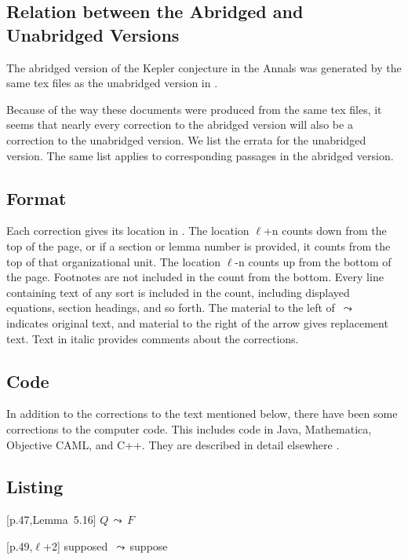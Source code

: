 \documentclass[11pt]{amsart}
\def\lto{\ensuremath{\,\leadsto\,}}
\def\line{$\ell$}
\begin{document}
\subsection{Relation between the Abridged and Unabridged Versions}

The abridged version of the Kepler conjecture
in the Annals \cite{Hales:2005:Annals}
was generated by the same tex
files as the unabridged version in \cite{Hales:2006:DCG}.

Because of the way these documents were produced
from the same tex files,
it seems that nearly every correction to
the abridged version will also be a correction to the unabridged version.
We list the errata for the
unabridged version. The same list applies to corresponding 
passages in the abridged version.  


\subsection{Format}

Each correction gives its location in \cite{Hales:2006:DCG}.
The location
\line+n counts down from the top of the page, or
if a section or lemma number is provided, it
counts from the top of that organizational unit.
The location \line-n counts up from the bottom
of the page. Footnotes are not included in the
count from the bottom.  Every line containing
text of any sort is included in the count,
including displayed equations, section headings,
and so forth.  The material to the left of $\lto$ 
indicates original text, and material to the right of the
arrow gives replacement text.  Text in italic provides
comments about the corrections.


\subsection{Code}

In addition to the corrections to the text mentioned below, 
there have been some corrections to the computer code.
This includes code in Java, Mathematica, Objective CAML, and C++.
They are described in detail elsewhere \cite{Hales:2008:Errata}.


\subsection{Listing}

[p.47,Lemma~5.16] $Q\lto F$

[p.49,\line+2] supposed \lto suppose
	
\end{document}
